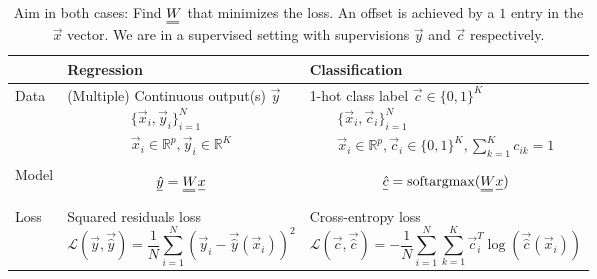 \begin{table}[!htb]
    \centering
    \begin{tabular}{|p{}|p{}|p{}|}
        \hline
        & \textcolor{blue1}{Regression} & \textcolor{blue1}{Classification} \\
        \hline
        Data & (Multiple) Continuous output(s) $\vec{y}$
        \begin{equation*}
            \begin{gathered}
                \{ \vec{x}_i, \vec{y}_i \}_{i=1}^{N} \\
                \vec{x}_i \in \mathbb{R}^p, \vec{y}_i \in \mathbb{R}^K
            \end{gathered}
        \end{equation*} & 1-hot class label $\vec{c} \in \{0,1\}^K$
        \begin{equation*}
            \begin{gathered}
                \{ \vec{x}_i, \vec{c}_i \}_{i=1}^{N} \\
                \vec{x}_i \in \mathbb{R}^p, \vec{c}_i \in \{0,1\}^K, \sum_{k=1}^{K} c_{ik} = 1
            \end{gathered}
        \end{equation*} \\
        \hline
        Model & \begin{equation*}
            \vec{\hat{y}} = \mat{W} \vec{x}
        \end{equation*} &
        \begin{equation*}
            \vec{\hat{c}} = \operatorname{softargmax}(\mat{W} \vec{x})
        \end{equation*} \\
        \hline
        Loss & Squared residuals loss \begin{equation*}
            \mathcal{L}(\vec{y}, \vec{\hat{y}}) = \frac{1}{N} \sum_{i=1}^{N} \left( \vec{y}_i - \vec{\hat{y}}(\vec{x}_i) \right)^2
        \end{equation*} &
        Cross-entropy loss \begin{equation*}
            \mathcal{L}(\vec{c}, \vec{\hat{c}}) = - \frac{1}{N} \sum_{i=1}^{N} \sum_{k=1}^{K} \vec{c}_i^T \log(\vec{\hat{c}}(\vec{x}_i))
        \end{equation*} \\
        \hline
    \end{tabular}
    \caption{Aim in both cases: Find $\mat{W}$ that minimizes the loss. An offset is achieved by a $1$ entry in the $\vec{x}$ vector.
    We are in a supervised setting with supervisions $\vec{y}$ and $\vec{c}$ respectively.}
    \label{tab:classification_vs_regression}
\end{table}

